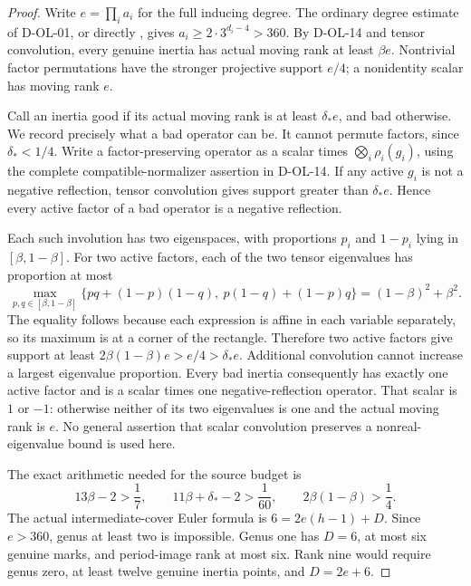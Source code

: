 \begin{proof}
Write $e=\prod_i a_i$ for the full inducing degree.  The
ordinary degree estimate of D-OL-01, or directly
\cite[Theorem~3.7, pp.~165--167]{OL:GLT2024}, gives
$a_i\ge2\cdot3^{d_i-4}>360$.
By D-OL-14 and tensor convolution, every genuine inertia has
actual moving rank at least $\beta e$.  Nontrivial factor
permutations have the stronger projective support $e/4$;
a nonidentity scalar has moving rank $e$.

Call an inertia good if its actual moving rank is at least
$\delta_*e$, and bad otherwise.  We record precisely what a
bad operator can be.  It cannot permute factors, since
$\delta_*<1/4$.  Write a factor-preserving operator as a
scalar times $\bigotimes_i\rho_i(g_i)$, using the complete
compatible-normalizer assertion in D-OL-14.  If any active
$g_i$ is not a negative reflection, tensor convolution gives
support greater than $\delta_*e$.  Hence every active factor
of a bad operator is a negative reflection.

Each such involution has two eigenspaces, with proportions
$p_i$ and $1-p_i$ lying in $[\beta,1-\beta]$.  For two active
factors, each of the two tensor eigenvalues has proportion at
most
\[
  \max_{p,q\in[\beta,1-\beta]}
       \{pq+(1-p)(1-q),\ p(1-q)+(1-p)q\}
       =(1-\beta)^2+\beta^2.
                                                               \tag{O3.9}
\]
The equality follows because each expression is affine in each
variable separately, so its maximum is at a corner of the
rectangle.  Therefore two active factors give support at least
$2\beta(1-\beta)e>e/4>\delta_*e$.  Additional convolution
cannot increase a largest eigenvalue proportion.  Every bad
inertia consequently has exactly one active factor and is a
scalar times one negative-reflection operator.  That scalar
is $1$ or $-1$: otherwise neither of its two eigenvalues is
one and the actual moving rank is $e$.  No general assertion
that scalar convolution preserves a nonreal-eigenvalue bound
is used here.

The exact arithmetic needed for the source budget is
\[
 13\beta-2>\frac17,\qquad
 11\beta+\delta_*-2>\frac1{60},\qquad
                  2\beta(1-\beta)>\frac14.                 \tag{O3.10}
\]
The actual intermediate-cover Euler formula is
$6=2e(h-1)+D$.  Since $e>360$, genus at least two is impossible.
Genus one has $D=6$, at most six genuine marks, and period-image
rank at most six.  Rank nine would require genus zero, at least
twelve genuine inertia points, and $D=2e+6$.


\end{proof}
